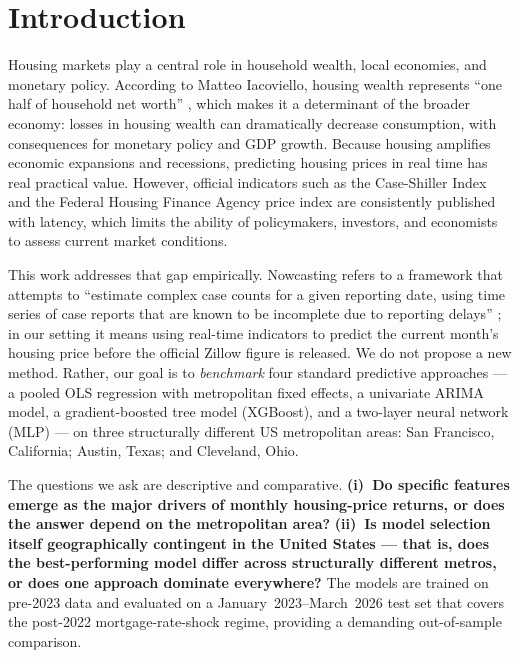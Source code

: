 \section{Introduction}

Housing markets play a central role in household wealth, local economies, and monetary policy. According to Matteo Iacoviello, housing wealth represents ``one half of household net worth'' \cite{iacoviello2011}, which makes it a determinant of the broader economy: losses in housing wealth can dramatically decrease consumption, with consequences for monetary policy and GDP growth. Because housing amplifies economic expansions and recessions, predicting housing prices in real time has real practical value. However, official indicators such as the Case-Shiller Index and the Federal Housing Finance Agency price index are consistently published with latency, which limits the ability of policymakers, investors, and economists to assess current market conditions.

This work addresses that gap empirically. Nowcasting refers to a framework that attempts to ``estimate complex case counts for a given reporting date, using time series of case reports that are known to be incomplete due to reporting delays'' \cite{mcgough2020}; in our setting it means using real-time indicators to predict the current month's housing price before the official Zillow figure is released. We do not propose a new method. Rather, our goal is to \emph{benchmark} four standard predictive approaches --- a pooled OLS regression with metropolitan fixed effects, a univariate ARIMA model, a gradient-boosted tree model (XGBoost), and a two-layer neural network (MLP) --- on three structurally different US metropolitan areas: San Francisco, California; Austin, Texas; and Cleveland, Ohio.

The questions we ask are descriptive and comparative. \textbf{(i)~Do specific features emerge as the major drivers of monthly housing-price returns, or does the answer depend on the metropolitan area?} \textbf{(ii)~Is model selection itself geographically contingent in the United States --- that is, does the best-performing model differ across structurally different metros, or does one approach dominate everywhere?} The models are trained on pre-2023 data and evaluated on a January~2023--March~2026 test set that covers the post-2022 mortgage-rate-shock regime, providing a demanding out-of-sample comparison.
